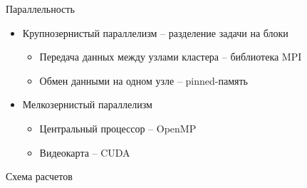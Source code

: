 \documentclass{beamer}
\begin{document}
\begin{frame}{Параллельность}
	\begin{itemize}
		\item Крупнозернистый параллелизм -- разделение задачи на блоки
		\begin{itemize}
			\item Передача данных между узлами кластера -- библиотека MPI
			\item Обмен данными на одном узле -- pinned-память
		\end{itemize}
		\item Мелкозернистый параллелизм
		\begin{itemize}
			\item Центральный процессор -- OpenMP
			\item Видеокарта -- CUDA
		\end{itemize}
	\end{itemize}
\end{frame}






\begin{frame}{Схема расчетов}
	\begin{figure}[h]
		\label{ris:scheme}
	\end{figure}
\end{frame}
\end{document}
